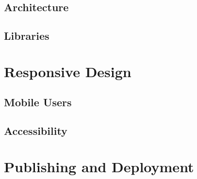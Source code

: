 \subsection{Architecture}
\subsection{Libraries}

\section{Responsive Design}

\subsection{Mobile Users}

\subsection{Accessibility}

\section{Publishing and Deployment}
\label{publishing}